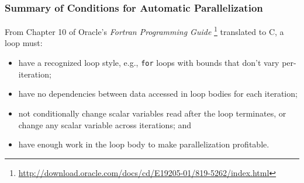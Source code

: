 \begin{frame}
  \frametitle{Summary of Conditions for Automatic Parallelization}


  From Chapter 10 of
  Oracle's \emph{Fortran Programming Guide}
  \footnote{\scriptsize \url{http://download.oracle.com/docs/cd/E19205-01/819-5262/index.html}}
  translated to C, a loop must:

  \begin{itemize}
    \item have a recognized loop style, e.g., {\tt for} loops with
      bounds that don't vary per-iteration;
    \item have no dependencies between data accessed in loop bodies for
      each iteration;
    \item not conditionally change scalar variables read after the loop
      terminates, or change any scalar variable across iterations; and
    \item have enough work in the loop body to make parallelization profitable.
  \end{itemize}

\end{frame}

